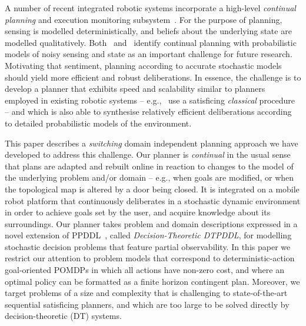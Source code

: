 



A number of recent integrated robotic systems incorporate a
high-level {\em continual planning} and execution monitoring
subsystem~\cite{wyattetal2010tamd,talamadupula:2010,Kraft2008}.
For the purpose of planning, sensing is modelled
deterministically, and beliefs about the underlying state are
modelled qualitatively.
Both~\citeauthor{talamadupula:2010} and~\citeauthor{wyattetal2010tamd}
identify
continual planning with probabilistic
models of noisy sensing and state as an important challenge for future
research.
Motivating that sentiment, planning according to accurate
stochastic models should yield more efficient and robust
deliberations.
In essence, the challenge is to develop a planner that
exhibits speed and scalability similar to planners employed in
existing robotic systems -- e.g.,~\citeauthor{wyattetal2010tamd} use a
satisficing {\em classical} procedure -- and which is also able to
synthesise relatively efficient deliberations according to detailed
probabilistic models of the environment.


This paper describes a {\em switching} domain independent planning
approach we have developed to address this challenge. 
Our planner is {\em continual} in the usual sense that plans are
adapted and rebuilt online in reaction to changes to the model of the
underlying problem and/or domain -- e.g., when goals are
modified, or when the topological map is altered by a door being
closed.
It is integrated on a mobile robot platform that continuously
deliberates in a stochastic dynamic environment in order to achieve
goals set by the user, and acquire knowledge about its surroundings.
Our planner takes problem and domain descriptions expressed in a novel
extension of PPDDL~\cite{younes:etal:2005}, called {\em
Decision-Theoretic DTPDDL}, for modelling stochastic decision problems
that feature partial observability.  In this paper we restrict our
attention to problem models that correspond to deterministic-action
goal-oriented POMDPs in which all actions have non-zero cost, and
where an optimal policy can be formatted as a finite horizon
contingent plan. Moreover, we target problems of a size and complexity
that is challenging to state-of-the-art sequential satisficing
planners, and which are too large to be solved directly by
decision-theoretic (DT) systems.

